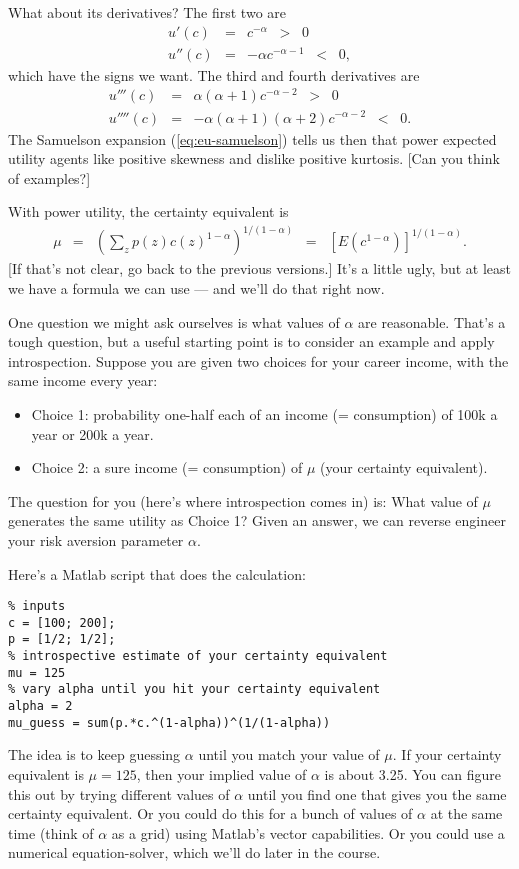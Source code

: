 What about its derivatives?
The first two are
\begin{eqnarray*}
    u'(c)  &=& c^{-\alpha} \;\;>\;\; 0 \\
    u''(c) &=& -\alpha c^{-\alpha-1} \;\;<\;\; 0 ,
\end{eqnarray*}
which have the signs we want.
The third and fourth derivatives are
\begin{eqnarray*}
    u'''(c)  &=& \alpha (\alpha+1) c^{-\alpha-2} \;\;>\;\; 0 \\
    u''''(c) &=& - \alpha (\alpha+1) (\alpha+2) c^{-\alpha-2} \;\;<\;\; 0 .
\end{eqnarray*}
The Samuelson expansion (\ref{eq:eu-samuelson}) tells us then that
power expected utility agents like positive skewness
and dislike positive kurtosis.
[Can you think of examples?]

With power utility,
the certainty equivalent is
\begin{eqnarray}
    \mu &=& \left( \sum_z p(z) c(z)^{1-\alpha} \right)^{1/(1-\alpha)}
        \;\;=\;\; \left[ E (c^{1-\alpha}) \right]^{1/(1-\alpha)} .
    \label{eq:certainty-equivalent-power}
\end{eqnarray}
[If that's not clear, go back to the previous versions.]
It's a little ugly, but at least we have a formula we can use ---
and we'll do that right now.


One question we might ask ourselves is what values of $\alpha$ are reasonable.
That's a tough question,
but a useful starting point is to consider an example and apply introspection.
Suppose you are given two choices for your career income, with the same
income every year:
\begin{itemize}
\item Choice 1:  probability one-half each of an income (= consumption)
of 100k a year or 200k a year.
\item Choice 2:  a sure income (= consumption) of $\mu$ (your certainty equivalent).
\end{itemize}
The question for you (here's where introspection comes in) is:
What value of $\mu$ generates the same utility as Choice 1?
Given an answer, we can reverse engineer your risk aversion
parameter $\alpha$.

Here's a Matlab script that does the calculation:
\begin{verbatim}
% inputs
c = [100; 200];
p = [1/2; 1/2];
% introspective estimate of your certainty equivalent
mu = 125
% vary alpha until you hit your certainty equivalent
alpha = 2
mu_guess = sum(p.*c.^(1-alpha))^(1/(1-alpha))
\end{verbatim}
The idea is to keep guessing $\alpha$ until you match your value of $\mu$.
If your certainty equivalent is $\mu = 125$, then
your implied value of $\alpha$ is about 3.25.
You can figure this out by trying different values of $\alpha$
until you find one that gives you the same certainty equivalent.
Or you could do this for a bunch of values of $\alpha$ at the same time
(think of $\alpha$ as a grid)
using Matlab's vector capabilities.
Or you could use a numerical equation-solver,
which we'll do later in the course.


